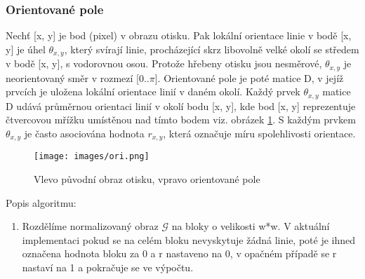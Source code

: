 \documentclass[a4paper,11pt]{article}
\begin{document}
\begin{multicols*}{2}
        \subsubsection{Orientované pole}
        Nechť [x, y] je bod (pixel) v obrazu otisku. Pak lokální orientace linie v bodě [x, y] je úhel $\theta_{x,y}$, který svírají linie, procházející skrz libovolně velké okolí se středem v bodě [x, y], s vodorovnou osou. Protože hřebeny otisku jsou nesměrové, $\theta_{x,y}$ je neorientovaný směr v rozmezí [0..$\pi$]. Orientované pole je poté matice D, v jejíž prvcích je uložena lokální orientace linií v daném okolí. Každý prvek $\theta_{x,y}$ matice D udává průměrnou orientaci linií v okolí bodu [x, y], kde bod [x, y] reprezentuje čtvercovou mřížku umístěnou nad tímto bodem viz. obrázek \ref{fig:ori}. S každým prvkem $\theta_{x,y}$ je často asociována hodnota $r_{x,y}$, která označuje míru spolehlivosti orientace.
        
        \begin{figure}[H]
            \centering
                {\texttt{[image: images/ori.png]}}\\
                \caption{Vlevo původní obraz otisku, vpravo orientované pole}
                \label{fig:ori}
        \end{figure}
        
        Popis algoritmu:
        \begin{enumerate}
            \item Rozdělíme normalizovaný obraz $\mathcal{G}$ na bloky o velikosti w*w. V aktuální implementaci pokud se na celém bloku nevyskytuje žádná linie, poté je ihned označena hodnota bloku za 0 a r nastaveno na 0, v opačném případě se r nastaví na 1 a pokračuje se ve výpočtu.
            

\end{enumerate}
\end{multicols*}
\end{document}
